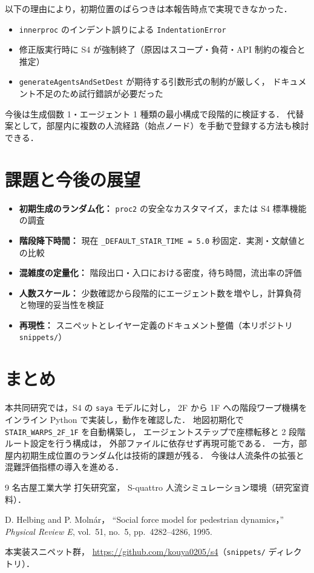 \documentclass[11pt,a4paper]{ltjsarticle}
\begin{document}
以下の理由により，初期位置のばらつきは本報告時点で実現できなかった．
\begin{itemize}
  \item \texttt{innerproc} のインデント誤りによる \texttt{IndentationError}
  \item 修正版実行時に S4 が強制終了（原因はスコープ・負荷・API 制約の複合と推定）
  \item \texttt{generateAgentsAndSetDest} が期待する引数形式の制約が厳しく，
        ドキュメント不足のため試行錯誤が必要だった
\end{itemize}

今後は生成個数 1・エージェント 1 種類の最小構成で段階的に検証する．
代替案として，部屋内に複数の人流経路（始点ノード）を手動で登録する方法も検討できる．

\section{課題と今後の展望}

\begin{itemize}
  \item \textbf{初期生成のランダム化：}
        \texttt{proc2} の安全なカスタマイズ，または S4 標準機能の調査
  \item \textbf{階段降下時間：}
        現在 \texttt{\_DEFAULT\_STAIR\_TIME = 5.0} 秒固定．実測・文献値との比較
  \item \textbf{混雑度の定量化：}
        階段出口・入口における密度，待ち時間，流出率の評価
  \item \textbf{人数スケール：}
        少数確認から段階的にエージェント数を増やし，計算負荷と物理的妥当性を検証
  \item \textbf{再現性：}
        スニペットとレイヤー定義のドキュメント整備（本リポジトリ \texttt{snippets/}）
\end{itemize}

\section{まとめ}

本共同研究では，S4 の \texttt{saya} モデルに対し，
2F から 1F への階段ワープ機構をインライン Python で実装し，動作を確認した．
地図初期化で \texttt{STAIR\_WARPS\_2F\_1F} を自動構築し，
エージェントステップで座標転移と 2 段階ルート設定を行う構成は，
外部ファイルに依存せず再現可能である．
一方，部屋内初期生成位置のランダム化は技術的課題が残る．
今後は人流条件の拡張と混難評価指標の導入を進める．

\begin{thebibliography}{9}
  名古屋工業大学 打矢研究室，
  S-quattro 人流シミュレーション環境（研究室資料）．

  D. Helbing and P. Moln\'ar，
  ``Social force model for pedestrian dynamics，''
  \textit{Physical Review E}, vol.~51, no.~5, pp.~4282--4286, 1995.

  本実装スニペット群，
  \url{https://github.com/kouya0205/s4}（\texttt{snippets/} ディレクトリ）．
\end{thebibliography}
\end{document}
